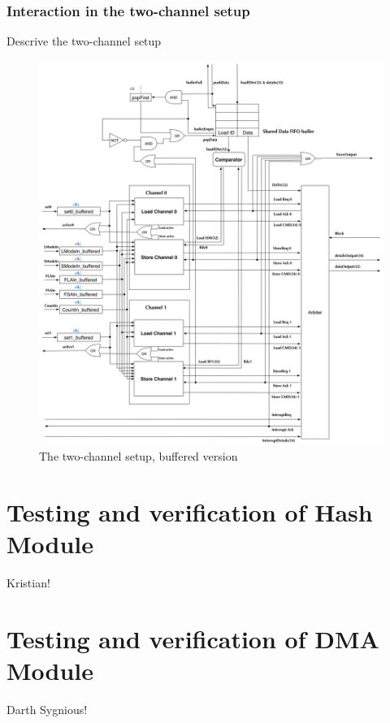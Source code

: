 \subsubsection{Interaction in the two-channel setup}
Descrive the two-channel setup
\begin{figure}[h!]
    \centering
    \includegraphics[width=1.25\textwidth]{Figures/DMA/TwoChannelSetUpBuffered}
    \caption{The two-channel setup, buffered version}
    \label{fig:twoChannelSetup}
\end{figure}


\section{Testing and verification of Hash Module}
Kristian!

\section{Testing and verification of DMA Module}
Darth Sygnious!